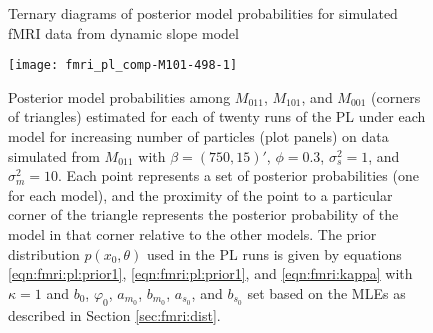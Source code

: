 %
%

\begin{figure}
\ssp
\centering
\caption{Ternary diagrams of posterior model probabilities for simulated fMRI data from dynamic slope model} \label{fig:fmri:comp:M011}
\texttt{[image: fmri\_pl\_comp-M101-498-1]}
\caption*{Posterior model probabilities among $M_{011}$, $M_{101}$, and $M_{001}$ (corners of triangles) estimated for each of twenty runs of the PL under each model for increasing number of particles (plot panels) on data simulated from $M_{011}$ with $\beta = (750,15)'$, $\phi = 0.3$, $\sigma^2_s = 1$, and $\sigma^2_m = 10$. Each point represents a set of posterior probabilities (one for each model), and the proximity of the point to a particular corner of the triangle represents the posterior probability of the model in that corner relative to the other models. The prior distribution $p(x_0,\theta)$ used in the PL runs is given by equations \eqref{eqn:fmri:pl:prior1}, \eqref{eqn:fmri:pl:prior1}, and \eqref{eqn:fmri:kappa} with $\kappa = 1$ and $b_0$, $\varphi_0$, $a_{m_0}$, $b_{m_0}$, $a_{s_0}$, and $b_{s_0}$ set based on the MLEs as described in Section \ref{sec:fmri:dist}.}
\end{figure}

